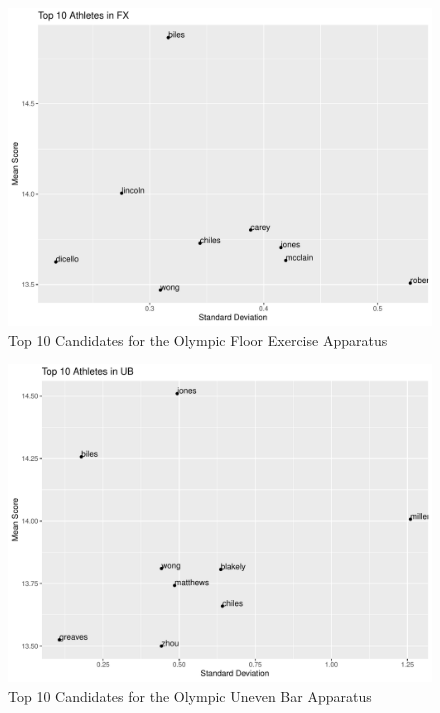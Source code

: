 \documentclass[12pt]{article}
\begin{document}
\begin{figure}[tbp]
  \centering
  \includegraphics[scale=0.6]{Top10AthletesFX.pdf}
  \caption{Top 10 Candidates for the Olympic Floor Exercise Apparatus}
  \label{fig:FX}
\end{figure}

\begin{figure}[tbp]
  \centering
  \includegraphics[scale=0.6]{Top10AthletesUB.pdf}
  \caption{Top 10 Candidates for the Olympic Uneven Bar Apparatus}
  \label{fig:UB}
\end{figure}
\end{document}
